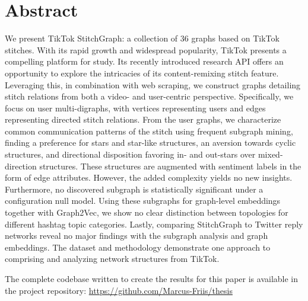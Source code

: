 \chapter*{Abstract}

We present TikTok StitchGraph: a collection of $36$ graphs based on TikTok stitches. With its rapid growth and widespread popularity, TikTok presents a compelling platform for study. Its recently introduced research API offers an opportunity to explore the intricacies of its content-remixing stitch feature. Leveraging this, in combination with web scraping, we construct graphs detailing stitch relations from both a video- and user-centric perspective. Specifically, we focus on user multi-digraphs, with vertices representing users and edges representing directed stitch relations. From the user graphs, we characterize common communication patterns of the stitch using frequent subgraph mining, finding a preference for stars and star-like structures, an aversion towards cyclic structures, and directional disposition favoring in- and out-stars over mixed-direction structures. These structures are augmented with sentiment labels in the form of edge attributes. However, the added complexity yields no new insights. Furthermore, no discovered subgraph is statistically significant under a configuration null model. Using these subgraphs for graph-level embeddings together with Graph2Vec, we show no clear distinction between topologies for different hashtag topic categories. Lastly, comparing StitchGraph to Twitter reply networks reveal no major findings with the subgraph analysis and graph embeddings. The dataset and methodology demonstrate one approach to comprising and analyzing network structures from TikTok.  

The complete codebase written to create the results for this paper is available in the project repository: \url{https://github.com/Marcus-Friis/thesis}






